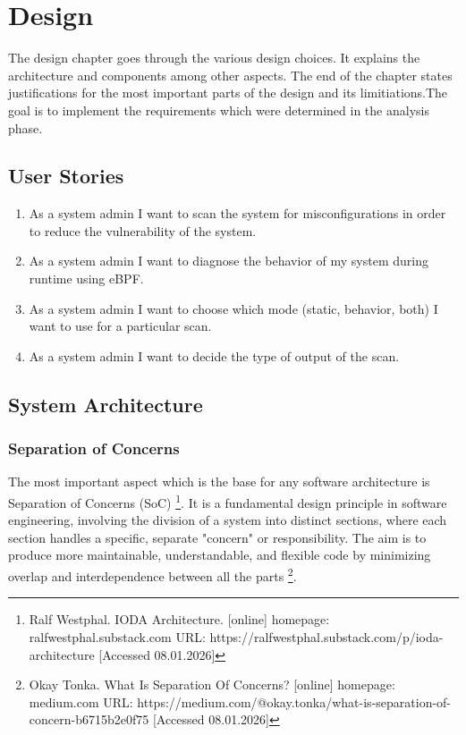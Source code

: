 \section{Design}

The design chapter goes through the various design choices. It explains the architecture and components among other aspects. The end of the chapter states justifications for the most important parts of the design and its limitiations.\newline\newline The goal is to implement the requirements which were determined in the analysis phase.

\subsection{User Stories}

\begin{enumerate}
	\item As a system admin I want to scan the system for misconfigurations in order to reduce the vulnerability of the system.
	\item As a system admin I want to diagnose the behavior of my system during runtime using eBPF.
	\item As a system admin I want to choose which mode (static, behavior, both) I want to use for a particular scan.
	\item As a system admin I want to decide the type of output of the scan.
\end{enumerate}

\subsection{System Architecture}

\subsubsection{Separation of Concerns}

The most important aspect which is the base for any software architecture is Separation of Concerns (SoC) \footnote{Ralf Westphal. IODA Architecture. [online] homepage: ralfwestphal.substack.com URL: https://ralfwestphal.substack.com/p/ioda-architecture [Accessed 08.01.2026]}. It is a fundamental design principle in software engineering, involving the division of a system into distinct sections, where each section handles a specific, separate "concern" or responsibility. The aim is to produce more maintainable, understandable, and flexible code by minimizing overlap and interdependence between all the parts \footnote{Okay Tonka. What Is Separation Of Concerns? [online] homepage: medium.com URL: https://medium.com/@okay.tonka/what-is-separation-of-concern-b6715b2e0f75 [Accessed 08.01.2026]}.


